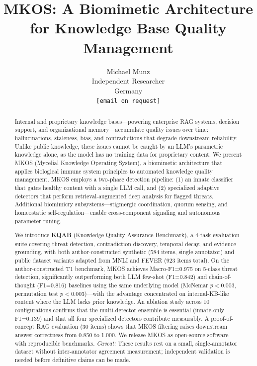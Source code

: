 \documentclass[11pt]{article}
\title{MKOS: A Biomimetic Architecture for Knowledge Base Quality Management}
\author{
  Michael Munz\\
  Independent Researcher\\
  Germany\\
  \texttt{[email on request]}
}
\date{}
\begin{document}
\maketitle

\begin{abstract}
Internal and proprietary knowledge bases---powering enterprise RAG systems, decision support, and organizational memory---accumulate quality issues over time: hallucinations, staleness, bias, and contradictions that degrade downstream reliability. Unlike public knowledge, these issues cannot be caught by an LLM's parametric knowledge alone, as the model has no training data for proprietary content. We present MKOS (Mycelial Knowledge Operating System), a biomimetic architecture that applies biological immune system principles to automated knowledge quality management. MKOS employs a two-phase detection pipeline: (1) an innate classifier that gates healthy content with a single LLM call, and (2) specialized adaptive detectors that perform retrieval-augmented deep analysis for flagged threats. Additional biomimicry subsystems---stigmergic coordination, quorum sensing, and homeostatic self-regulation---enable cross-component signaling and autonomous parameter tuning.

We introduce \textbf{KQAB} (Knowledge Quality Assurance Benchmark), a 4-task evaluation suite covering threat detection, contradiction discovery, temporal decay, and evidence grounding, with both author-constructed synthetic (584 items, single annotator) and public dataset variants adapted from MNLI and FEVER (923 items total). On the author-constructed T1 benchmark, MKOS achieves Macro-F1=0.975 on 5-class threat detection, significantly outperforming both LLM few-shot (F1=0.842) and chain-of-thought (F1=0.816) baselines using the same underlying model (McNemar $p{<}0.003$, permutation test $p{<}0.003$)---with the advantage concentrated on internal-KB-like content where the LLM lacks prior knowledge. An ablation study across 10 configurations confirms that the multi-detector ensemble is essential (innate-only F1=0.139) and that all four specialized detectors contribute measurably. A proof-of-concept RAG evaluation (30 items) shows that MKOS filtering raises downstream answer correctness from 0.850 to 1.000. We release MKOS as open-source software with reproducible benchmarks. \emph{Caveat:} These results rest on a small, single-annotator dataset without inter-annotator agreement measurement; independent validation is needed before definitive claims can be made.
\end{abstract}
\end{document}
